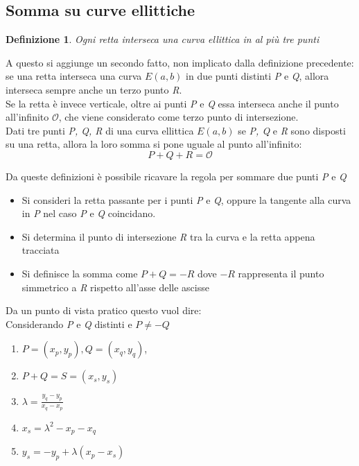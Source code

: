 \documentclass[12pt, a4paper]{report}
\newtheorem{definition}{Definizione}[section]
\begin{document}
\subsection{Somma su curve ellittiche}
\label{sec:Somma}

\begin{definition}
    Ogni retta interseca una curva ellittica in al più tre punti \cite{Margara}
\end{definition}

A questo si aggiunge un secondo fatto, non implicato dalla definizione precedente: se una retta interseca una curva $E(a, b)$ in due punti distinti \textit{P} e \textit{Q}, allora interseca sempre anche un terzo punto \textit{R}.
\\Se la retta è invece verticale, oltre ai punti \textit{P} e \textit{Q} essa interseca anche il punto all'infinito $\mathcal{O}$, che viene considerato come terzo punto di intersezione.
\\Dati tre punti \textit{P, Q, R} di una curva ellittica $E(a, b)$ se \textit{P, Q} e \textit{R} sono disposti su una retta, allora la loro somma si pone uguale al punto all'infinito:
\begin{equation}
    P + Q + R = \mathcal{O}
\end{equation}

Da queste definizioni è possibile ricavare la regola per sommare due punti \textit{P} e \textit{Q}

\begin{itemize}
    \item Si consideri la retta passante per i punti \textit{P} e \textit{Q}, oppure la tangente alla curva in \textit{P} nel caso \textit{P} e \textit{Q} coincidano.
    \item Si determina il punto di intersezione \textit{R} tra la curva e la retta appena tracciata
    \item Si definisce la somma come $P + Q = -R$ dove $-R$ rappresenta il punto simmetrico a \textit{R} rispetto all'asse delle ascisse
\end{itemize}
Da un punto di vista pratico questo vuol dire:
\\Considerando \textit{P} e \textit{Q} distinti e $P \neq - Q$
\begin{enumerate}
    \item $P = (x_p, y_p), Q = (x_q, y_q)$,
    \item $P + Q = S = (x_s, y_s)$
    \item  $\lambda = \frac{y_q - y_p}{x_q - x_p}$
    \item $x_s = \lambda^2 - x_p - x_q$
    \item $y_s = -y_p + \lambda(x_p - x_s)$
\end{enumerate}
\end{document}
